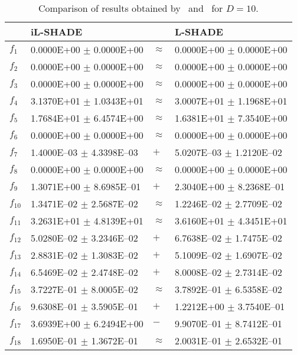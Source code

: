 \begin{table}[ht]
\centering
\caption{Comparison of results obtained by {\sf \ilshade}\ and {\sf \LSHADE}\ for $D=10$.} 
\label{tab:D10}
\begin{tabular}{|l|ll|l|}
  \hline
 & iL-SHADE &  & L-SHADE \\ 
  \hline \hline
$f_{1}$ & 0.0000E+00 $\pm$ 0.0000E+00 & $\approx$ & 0.0000E+00 $\pm$ 0.0000E+00 \\ 
  $f_{2}$ & 0.0000E+00 $\pm$ 0.0000E+00 & $\approx$ & 0.0000E+00 $\pm$ 0.0000E+00 \\ 
  $f_{3}$ & 0.0000E+00 $\pm$ 0.0000E+00 & $\approx$ & 0.0000E+00 $\pm$ 0.0000E+00 \\ 
  $f_{4}$ & 3.1370E+01 $\pm$ 1.0343E+01 & $\approx$ & 3.0007E+01 $\pm$ 1.1968E+01 \\ 
  $f_{5}$ & 1.7684E+01 $\pm$ 6.4574E+00 & $\approx$ & 1.6381E+01 $\pm$ 7.3540E+00 \\ 
  $f_{6}$ & 0.0000E+00 $\pm$ 0.0000E+00 & $\approx$ & 0.0000E+00 $\pm$ 0.0000E+00 \\ 
  $f_{7}$ & 1.4000E--03 $\pm$ 4.3398E--03 & $+$ & 5.0207E--03 $\pm$ 1.2120E--02 \\ 
  $f_{8}$ & 0.0000E+00 $\pm$ 0.0000E+00 & $\approx$ & 0.0000E+00 $\pm$ 0.0000E+00 \\ 
  $f_{9}$ & 1.3071E+00 $\pm$ 8.6985E--01 & $+$ & 2.3040E+00 $\pm$ 8.2368E--01 \\ 
  $f_{10}$ & 1.3471E--02 $\pm$ 2.5687E--02 & $\approx$ & 1.2246E--02 $\pm$ 2.7709E--02 \\ 
  $f_{11}$ & 3.2631E+01 $\pm$ 4.8139E+01 & $\approx$ & 3.6160E+01 $\pm$ 4.3451E+01 \\ 
  $f_{12}$ & 5.0280E--02 $\pm$ 3.2346E--02 & $+$ & 6.7638E--02 $\pm$ 1.7475E--02 \\ 
  $f_{13}$ & 2.8831E--02 $\pm$ 1.3083E--02 & $+$ & 5.1009E--02 $\pm$ 1.6907E--02 \\ 
  $f_{14}$ & 6.5469E--02 $\pm$ 2.4748E--02 & $+$ & 8.0008E--02 $\pm$ 2.7314E--02 \\ 
  $f_{15}$ & 3.7227E--01 $\pm$ 8.0005E--02 & $\approx$ & 3.7892E--01 $\pm$ 6.5358E--02 \\ 
  $f_{16}$ & 9.6308E--01 $\pm$ 3.5905E--01 & $+$ & 1.2212E+00 $\pm$ 3.7540E--01 \\ 
  $f_{17}$ & 3.6939E+00 $\pm$ 6.2494E+00 & $-$ & 9.9070E--01 $\pm$ 8.7412E--01 \\ 
  $f_{18}$ & 1.6950E--01 $\pm$ 1.3672E--01 & $\approx$ & 2.0031E--01 $\pm$ 2.6532E--01 \\ 

\end{tabular}
\end{table}
